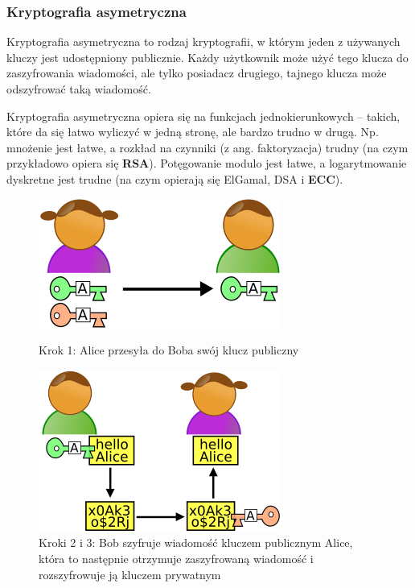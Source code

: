 \documentclass[a4paper,12pt,oneside]{book}
\begin{document}
				\subsubsection*{Kryptografia asymetryczna}
				
				Kryptografia asymetryczna to rodzaj kryptografii, w którym jeden z używanych kluczy jest udostępniony publicznie. Każdy użytkownik może użyć tego klucza do zaszyfrowania wiadomości, ale tylko posiadacz drugiego, tajnego klucza może odszyfrować taką wiadomość.
				
				Kryptografia asymetryczna opiera się na funkcjach jednokierunkowych – takich, które da się łatwo wyliczyć w jedną stronę, ale bardzo trudno w drugą. Np. mnożenie jest łatwe, a rozkład na czynniki (z ang. faktoryzacja) trudny (na czym przykładowo opiera się \textbf{RSA}). Potęgowanie modulo jest łatwe, a logarytmowanie dyskretne jest trudne (na czym opierają się ElGamal, DSA i \textbf{ECC}).
				
				\begin{figure}[h]
					\centering\includegraphics[scale=0.45]{krypt_asym_1.png}
					\caption{Krok 1: Alice przesyła do Boba swój klucz publiczny}
					
					\hspace{5pt}
					
					\centering\includegraphics[scale=0.45]{krypt_asym_2.png}
					\caption{Kroki 2 i 3: Bob szyfruje wiadomość kluczem publicznym Alice, która to następnie otrzymuje zaszyfrowaną wiadomość i rozszyfrowuje ją kluczem prywatnym}
				\end{figure}
				
\end{document}

